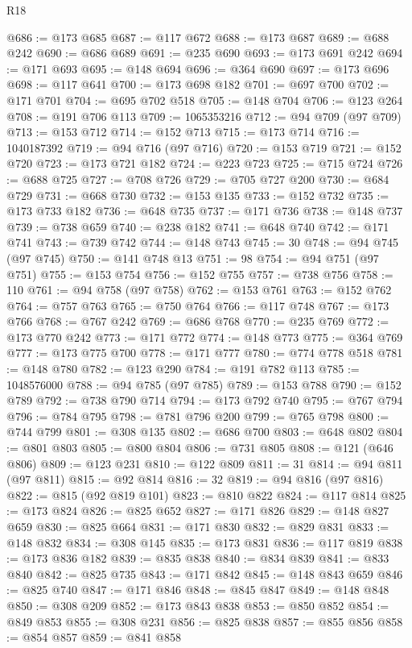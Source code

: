 \begin{lexlean}{R18}
\begin{coremodule}
@686 := @173 @685
@687 := @117 @672
@688 := @173 @687
@689 := @688 @242
@690 := @686 @689
@691 := @235 @690
@693 := @173 @691 @242
@694 := @171 @693
@695 := @148 @694
@696 := @364 @690
@697 := @173 @696
@698 := @117 @641
@700 := @173 @698 @182
@701 := @697 @700
@702 := @171 @701
@704 := @695 @702 @518
@705 := @148 @704
@706 := @123 @264
@708 := @191 @706 @113
@709 := 1065353216
@712 := @94 @709 (@97 @709)
@713 := @153 @712
@714 := @152 @713
@715 := @173 @714
@716 := 1040187392
@719 := @94 @716 (@97 @716)
@720 := @153 @719
@721 := @152 @720
@723 := @173 @721 @182
@724 := @223 @723
@725 := @715 @724
@726 := @688 @725
@727 := @708 @726
@729 := @705 @727 @200
@730 := @684 @729
@731 := @668 @730
@732 := @153 @135
@733 := @152 @732
@735 := @173 @733 @182
@736 := @648 @735
@737 := @171 @736
@738 := @148 @737
@739 := @738 @659
@740 := @238 @182
@741 := @648 @740
@742 := @171 @741
@743 := @739 @742
@744 := @148 @743
@745 := 30
@748 := @94 @745 (@97 @745)
@750 := @141 @748 @13
@751 := 98
@754 := @94 @751 (@97 @751)
@755 := @153 @754
@756 := @152 @755
@757 := @738 @756
@758 := 110
@761 := @94 @758 (@97 @758)
@762 := @153 @761
@763 := @152 @762
@764 := @757 @763
@765 := @750 @764
@766 := @117 @748
@767 := @173 @766
@768 := @767 @242
@769 := @686 @768
@770 := @235 @769
@772 := @173 @770 @242
@773 := @171 @772
@774 := @148 @773
@775 := @364 @769
@777 := @173 @775 @700
@778 := @171 @777
@780 := @774 @778 @518
@781 := @148 @780
@782 := @123 @290
@784 := @191 @782 @113
@785 := 1048576000
@788 := @94 @785 (@97 @785)
@789 := @153 @788
@790 := @152 @789
@792 := @738 @790 @714
@794 := @173 @792 @740
@795 := @767 @794
@796 := @784 @795
@798 := @781 @796 @200
@799 := @765 @798
@800 := @744 @799
@801 := @308 @135
@802 := @686 @700
@803 := @648 @802
@804 := @801 @803
@805 := @800 @804
@806 := @731 @805
@808 := @121 (@646 @806)
@809 := @123 @231
@810 := @122 @809
@811 := 31
@814 := @94 @811 (@97 @811)
@815 := @92 @814
@816 := 32
@819 := @94 @816 (@97 @816)
@822 := @815 (@92 @819 @101)
@823 := @810 @822
@824 := @117 @814
@825 := @173 @824
@826 := @825 @652
@827 := @171 @826
@829 := @148 @827 @659
@830 := @825 @664
@831 := @171 @830
@832 := @829 @831
@833 := @148 @832
@834 := @308 @145
@835 := @173 @831
@836 := @117 @819
@838 := @173 @836 @182
@839 := @835 @838
@840 := @834 @839
@841 := @833 @840
@842 := @825 @735
@843 := @171 @842
@845 := @148 @843 @659
@846 := @825 @740
@847 := @171 @846
@848 := @845 @847
@849 := @148 @848
@850 := @308 @209
@852 := @173 @843 @838
@853 := @850 @852
@854 := @849 @853
@855 := @308 @231
@856 := @825 @838
@857 := @855 @856
@858 := @854 @857
@859 := @841 @858

\end{coremodule}
\end{lexlean}
